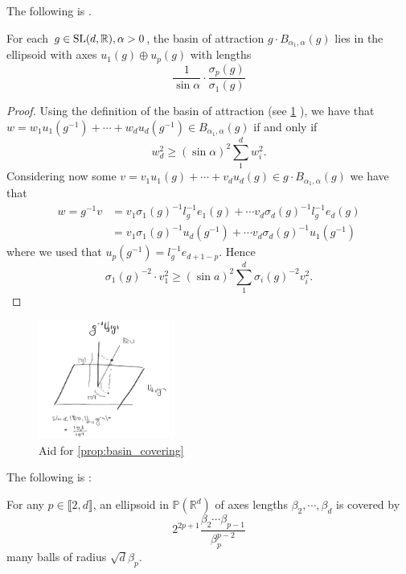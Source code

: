 \documentclass{report}
\begin{document}
The following is \cite[Proposition 3.8]{pozzetti_anosov_2023}.
\begin{proposition}\label{prop:basin_covering}
For each $g\in \operatorname{{\mathrm{SL}}}(d, \mathbb R), \alpha > 0$, 
the basin of attraction $g \cdot B_{\alpha_1, \alpha}(g)$ lies in the ellipsoid with axes $u_1(g) \oplus u_p(g)$ with lengths
\[
    \frac{1}{\sin \alpha} \cdot \frac{\sigma_p(g)}{\sigma_1(g)}
\]
\end{proposition}
\begin{proof}
Using the definition of the basin of attraction (see \cref*{fig:projection} ), we have that $w = w_1 u_1(g^{-1}) + \cdots + w_d u_d(g^{-1}) \in B_{\alpha_1, \alpha}(g)$ if and only if
\[
    w_d^2 \geq (\sin \alpha)^2 \sum_1^d w_i^2.
\]
Considering now some $v = v_1 u_1(g) + \cdots + v_d u_d(g) \in g \cdot B_{\alpha_1, \alpha}(g)$
we have that
\begin{align*}
    w = g^{-1} v &= v_1 \sigma_1(g)^{-1} l_g^{-1} e_1(g) + \cdots v_d \sigma_d(g)^{-1} l_g^{-1} e_d(g)\\
    &= v_1 \sigma_1(g)^{-1} u_{d}(g^{-1}) + \cdots v_d \sigma_d(g)^{-1} u_1(g^{-1})
\end{align*}
where we used that $u_p(g^{-1}) = l_g^{-1} e_{d+1-p}$.
Hence
\[
    \sigma_1(g)^{-2} \cdot v_1^2 \geq (\sin a)^2 \sum_1^d \sigma_i(g)^{-2} v_i^2.
\]
\end{proof}
\begin{figure}[h]
    \centering
    \includegraphics[width=0.4\textwidth]{projection.jpg}
    \caption{Aid for \cref{prop:basin_covering}}
    \label{fig:projection}
\end{figure}

The following is \cite[Lemma 3.7]{pozzetti_anosov_2023}:
\begin{lemma}\label{lem:ellipsoid_covering}
For any $p \in \llbracket 2, d \rrbracket$, an ellipsoid in $\mathbb P(\mathbb R^d)$ of axes lengths $\beta_2, \cdots, \beta_d$ is covered by
\[
    2^{2p + 1} \frac{\beta_2 \cdots \beta_{p-1}}{\beta_p^{p-2}}
\]
many balls of radius $\sqrt{d} \beta_p$.
\end{lemma}
\end{document}
